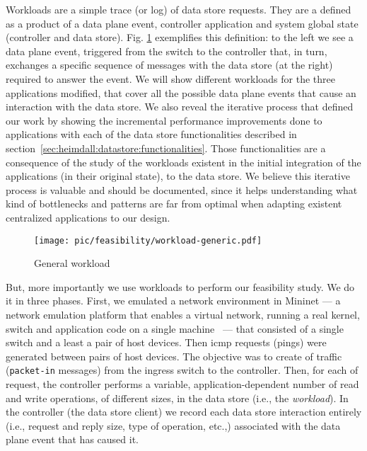 \documentclass[12pt,openright,twoside]{report}
\begin{document}
Workloads are a simple trace (or log) of data store requests. They are a defined as a product of a data plane event, controller application and system global state (controller and data store).
Fig. \ref{fig:feasibility:workloads} exemplifies this definition: to the left we see a data plane event, triggered from the switch to the controller that, in turn, exchanges a specific sequence of messages with the data store (at the right) required to answer the event.
We will show different workloads for the three applications modified, that cover all the possible data plane events that cause an interaction with the data store. We also reveal the iterative process that defined our work by showing the incremental performance improvements done to applications with each of the data store functionalities described in section~\ref{sec:heimdall:datastore:functionalities}. Those functionalities are   a consequence of the study of the workloads existent in the initial integration of the applications (in their original state), to the data store. We believe this iterative process is valuable and should be documented, since it helps understanding what kind of bottlenecks and patterns are far from optimal when adapting existent centralized applications to our design.  

\begin{figure}[ht]
  \centering
  \texttt{[image: pic/feasibility/workload-generic.pdf]}   
  \caption[General workload]{General workload}
  \label{fig:feasibility:workloads}
\end{figure}

But, more importantly we use workloads to perform our feasibility study. 
We do it in three phases. 
First, we emulated a network environment in Mininet  --- a network emulation platform that enables a virtual network, running a real kernel, switch and application code on a single machine~\cite{Handigol:2012tg} ---  that consisted of a single switch and a least a pair of host devices.
Then \gls{icmp} requests (pings) were generated between pairs of host devices. 
The objective was to create \gls{of}  traffic (\texttt{packet-in} messages) from the ingress switch to the controller.
Then, for each \gls{of} request, the controller performs a variable, application-dependent number of read and write operations, of different sizes, in the data store (i.e., the \textit{workload}). 
In the controller  (the data store client) we record each data store interaction entirely (i.e., request and reply size, type of operation, etc.,)  associated with the data plane event that has caused it. 
\end{document}
